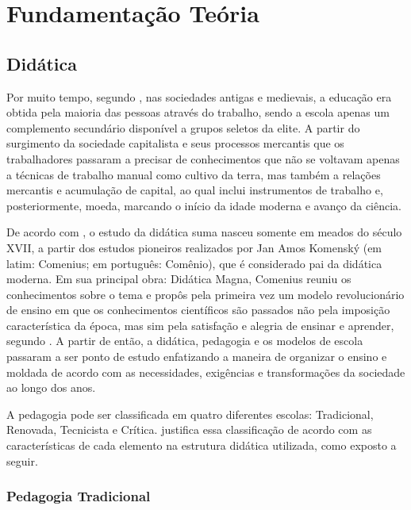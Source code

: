 \chapter{Fundamentação Teória}
\label{chap:concep}

\section{Didática}\label{sec:didatica}

Por muito tempo, segundo \cite{saviani}, nas sociedades antigas e medievais, a educação era obtida pela maioria das pessoas através do trabalho, sendo a escola apenas um complemento secundário disponível a grupos seletos da elite. A partir do surgimento da sociedade capitalista e seus processos mercantis que os trabalhadores passaram a precisar de conhecimentos que não se voltavam apenas a técnicas de trabalho manual como cultivo da terra, mas também a relações mercantis e acumulação de capital, ao qual inclui instrumentos de trabalho e, posteriormente, moeda, marcando o início da idade moderna e avanço da ciência.

De acordo com \cite{larchert}, o estudo da didática suma nasceu somente em meados do século XVII, a partir dos estudos pioneiros realizados por Jan Amos Komenský (em latim: Comenius; em português: Comênio), que é considerado pai da didática moderna. Em sua principal obra: Didática Magna, Comenius reuniu os conhecimentos sobre o tema e propôs pela primeira vez um modelo revolucionário de ensino em que os conhecimentos científicos são passados não pela imposição característica da época, mas sim pela satisfação e alegria de ensinar e aprender, segundo \cite{gasparin}. A partir de então, a didática, pedagogia e os modelos de escola passaram a ser ponto de estudo enfatizando a maneira de organizar o ensino e moldada de acordo com as necessidades, exigências e transformações da sociedade ao longo dos anos.

A pedagogia pode ser classificada em quatro diferentes escolas:  Tradicional, Renovada, Tecnicista e Crítica. \cite{larchert} justifica essa classificação de acordo com as características de cada elemento na estrutura didática utilizada, como exposto a seguir.

\subsection{Pedagogia Tradicional}\label{sec:ped_trad}

